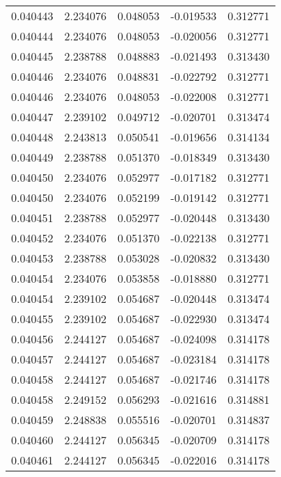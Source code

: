 \begin{tabular}{lrrrr}
0.040443    &  2.234076 &  0.048053 & -0.019533 &             0.312771 \\
0.040444    &  2.234076 &  0.048053 & -0.020056 &             0.312771 \\
0.040445    &  2.238788 &  0.048883 & -0.021493 &             0.313430 \\
0.040446    &  2.234076 &  0.048831 & -0.022792 &             0.312771 \\
0.040446    &  2.234076 &  0.048053 & -0.022008 &             0.312771 \\
0.040447    &  2.239102 &  0.049712 & -0.020701 &             0.313474 \\
0.040448    &  2.243813 &  0.050541 & -0.019656 &             0.314134 \\
0.040449    &  2.238788 &  0.051370 & -0.018349 &             0.313430 \\
0.040450    &  2.234076 &  0.052977 & -0.017182 &             0.312771 \\
0.040450    &  2.234076 &  0.052199 & -0.019142 &             0.312771 \\
0.040451    &  2.238788 &  0.052977 & -0.020448 &             0.313430 \\
0.040452    &  2.234076 &  0.051370 & -0.022138 &             0.312771 \\
0.040453    &  2.238788 &  0.053028 & -0.020832 &             0.313430 \\
0.040454    &  2.234076 &  0.053858 & -0.018880 &             0.312771 \\
0.040454    &  2.239102 &  0.054687 & -0.020448 &             0.313474 \\
0.040455    &  2.239102 &  0.054687 & -0.022930 &             0.313474 \\
0.040456    &  2.244127 &  0.054687 & -0.024098 &             0.314178 \\
0.040457    &  2.244127 &  0.054687 & -0.023184 &             0.314178 \\
0.040458    &  2.244127 &  0.054687 & -0.021746 &             0.314178 \\
0.040458    &  2.249152 &  0.056293 & -0.021616 &             0.314881 \\
0.040459    &  2.248838 &  0.055516 & -0.020701 &             0.314837 \\
0.040460    &  2.244127 &  0.056345 & -0.020709 &             0.314178 \\
0.040461    &  2.244127 &  0.056345 & -0.022016 &             0.314178 \\

\end{tabular}
